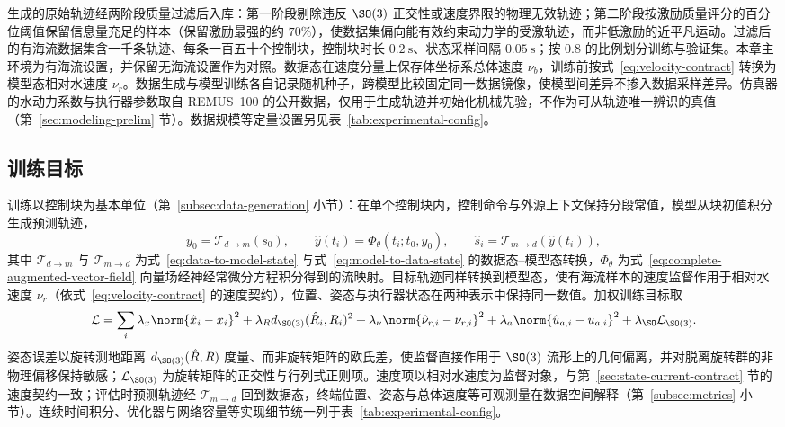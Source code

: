 生成的原始轨迹经两阶段质量过滤后入库：第一阶段剔除违反 \(\SO(3)\) 正交性或速度界限的物理无效轨迹；第二阶段按激励质量评分的百分位阈值保留信息量充足的样本（保留激励最强的约 \(70\%\)），使数据集偏向能有效约束动力学的受激轨迹，而非低激励的近平凡运动。过滤后的有海流数据集含一千条轨迹、每条一百五十个控制块，控制块时长 \(0.2~\mathrm{s}\)、状态采样间隔 \(0.05~\mathrm{s}\)；按 \(0.8\) 的比例划分训练与验证集。本章主环境为有海流设置，并保留无海流设置作为对照。数据态在速度分量上保存体坐标系总体速度 \(\nu_b\)，训练前按式~\eqref{eq:velocity-contract} 转换为模型态相对水速度 \(\nu_r\)。数据生成与模型训练各自记录随机种子，跨模型比较固定同一数据镜像，使模型间差异不掺入数据采样差异。仿真器的水动力系数与执行器参数取自 REMUS~100 的公开数据，仅用于生成轨迹并初始化机械先验，不作为可从轨迹唯一辨识的真值（第~\ref{sec:modeling-prelim} 节）。数据规模等定量设置另见表~\ref{tab:experimental-config}。

\subsection{训练目标}
\label{subsec:training-objective}

训练以控制块为基本单位（第~\ref{subsec:data-generation} 小节）：在单个控制块内，控制命令与外源上下文保持分段常值，模型从块初值积分生成预测轨迹，
\begin{equation}
  y_0=\mathcal{T}_{d\to m}(s_0),\qquad
  \hat y(t_i)=\Phi_\theta(t_i;t_0,y_0),\qquad
  \hat s_i=\mathcal{T}_{m\to d}(\hat y(t_i)),
  \label{eq:block-prediction}
\end{equation}
其中 \(\mathcal{T}_{d\to m}\) 与 \(\mathcal{T}_{m\to d}\) 为式~\eqref{eq:data-to-model-state} 与式~\eqref{eq:model-to-data-state} 的数据态--模型态转换，\(\Phi_\theta\) 为式~\eqref{eq:complete-augmented-vector-field} 向量场经神经常微分方程积分得到的流映射。目标轨迹同样转换到模型态，使有海流样本的速度监督作用于相对水速度 \(\nu_r\)（依式~\eqref{eq:velocity-contract} 的速度契约），位置、姿态与执行器状态在两种表示中保持同一数值。加权训练目标取
\begin{equation}
  \mathcal{L}
  =
  \sum_i
  \lambda_x\norm{\hat x_i-x_i}^2
  +\lambda_R d_{\SO(3)}(\hat R_i,R_i)^2
  +\lambda_\nu\norm{\hat\nu_{r,i}-\nu_{r,i}}^2
  +\lambda_a\norm{\hat u_{a,i}-u_{a,i}}^2
  +\lambda_{\SO}\mathcal{L}_{\SO(3)} .
  \label{eq:training-loss}
\end{equation}
姿态误差以旋转测地距离 \(d_{\SO(3)}(\hat R,R)\) 度量、而非旋转矩阵的欧氏差，使监督直接作用于 \(\SO(3)\) 流形上的几何偏离，并对脱离旋转群的非物理偏移保持敏感；\(\mathcal{L}_{\SO(3)}\) 为旋转矩阵的正交性与行列式正则项。速度项以相对水速度为监督对象，与第~\ref{sec:state-current-contract} 节的速度契约一致；评估时预测轨迹经 \(\mathcal{T}_{m\to d}\) 回到数据态，终端位置、姿态与总体速度等可观测量在数据空间解释（第~\ref{subsec:metrics} 小节）。连续时间积分、优化器与网络容量等实现细节统一列于表~\ref{tab:experimental-config}。

